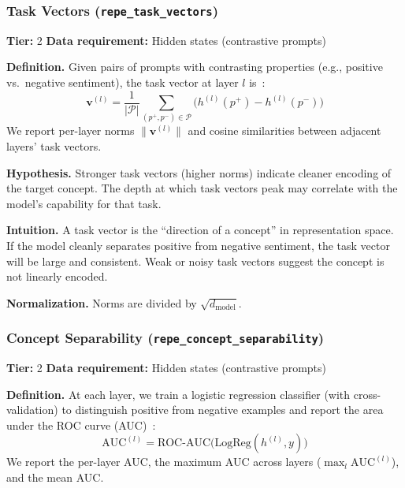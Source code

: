 \documentclass{article}
\begin{document}
\subsubsection{Task Vectors (\texttt{repe\_task\_vectors})}
\label{app:task-vectors}

\textbf{Tier:} 2 \quad \textbf{Data requirement:} Hidden states (contrastive prompts)

\textbf{Definition.}
Given pairs of prompts with contrasting properties (e.g., positive vs.\ negative sentiment), the task vector at layer $l$ is~\citep{zou2023representation}:
\begin{equation}
  \mathbf{v}^{(l)} = \frac{1}{|\mathcal{P}|}\sum_{(p^+, p^-) \in \mathcal{P}} \bigl(h^{(l)}(p^+) - h^{(l)}(p^-)\bigr)
\end{equation}
We report per-layer norms $\|\mathbf{v}^{(l)}\|$ and cosine similarities between adjacent layers' task vectors.

\textbf{Hypothesis.}
Stronger task vectors (higher norms) indicate cleaner encoding of the target concept. The depth at which task vectors peak may correlate with the model's capability for that task.

\textbf{Intuition.}
A task vector is the ``direction of a concept'' in representation space. If the model cleanly separates positive from negative sentiment, the task vector will be large and consistent. Weak or noisy task vectors suggest the concept is not linearly encoded.

\textbf{Normalization.} Norms are divided by $\sqrt{d_{\text{model}}}$.

\subsubsection{Concept Separability (\texttt{repe\_concept\_separability})}
\label{app:separability}

\textbf{Tier:} 2 \quad \textbf{Data requirement:} Hidden states (contrastive prompts)

\textbf{Definition.}
At each layer, we train a logistic regression classifier (with cross-validation) to distinguish positive from negative examples and report the area under the ROC curve (AUC)~\citep{zou2023representation}:
\begin{equation}
  \text{AUC}^{(l)} = \text{ROC-AUC}\!\bigl(\text{LogReg}(h^{(l)}, y)\bigr)
\end{equation}
We report the per-layer AUC, the maximum AUC across layers ($\max_l \text{AUC}^{(l)}$), and the mean AUC.
\end{document}
